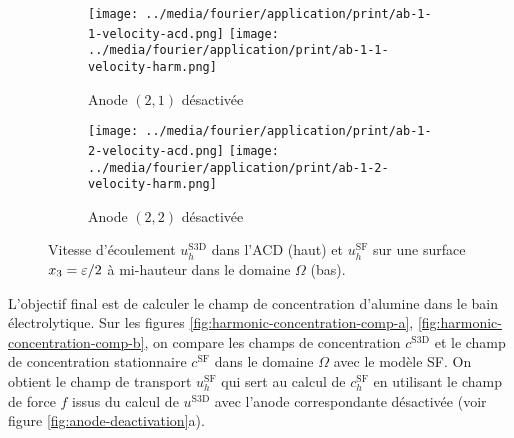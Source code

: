 \begin{figure}[h!]
  \begin{center}
    \begin{subfigure}[t]{\textwidth}
      \begin{center}
        \texttt{[image: ../media/fourier/application/print/ab-1-1-velocity-acd.png]}
        \texttt{[image: ../media/fourier/application/print/ab-1-1-velocity-harm.png]}
        \caption{Anode $(2,1)$ désactivée}
        \label{fig:}
      \end{center}
    \end{subfigure}

    \begin{subfigure}[t]{\textwidth}
      \begin{center}
        \texttt{[image: ../media/fourier/application/print/ab-1-2-velocity-acd.png]}
        \texttt{[image: ../media/fourier/application/print/ab-1-2-velocity-harm.png]}
        \caption{Anode $(2,2)$ désactivée}
        \label{fig:}
      \end{center}
    \end{subfigure}


    \caption{Vitesse d'écoulement $u_h^\mathrm{S3D}$ dans l'ACD (haut)
      et $u_h^\mathrm{SF}$ sur une surface $x_3 = \varepsilon / 2$ à
      mi-hauteur dans le domaine $\Omega$ (bas).}

    \label{fig:harmonic-velocity-comp-b}
  \end{center}
\end{figure}

L'objectif final est de calculer le champ de concentration d'alumine
dans le bain électrolytique. Sur les figures
\ref{fig:harmonic-concentration-comp-a},
\ref{fig:harmonic-concentration-comp-b}, on compare les champs de
concentration $c^\mathrm{S3D}$ et le champ de concentration
stationnaire $c^\mathrm{SF}$ dans le domaine $\Omega$ avec le modèle
SF. On obtient le champ de transport $u_h^\mathrm{SF}$ qui sert au
calcul de $c_h^\mathrm{SF}$ en utilisant le champ de force $f$ issus
du calcul de $u^\mathrm{S3D}$ avec l'anode correspondante désactivée
(voir figure \ref{fig:anode-deactivation}a).

